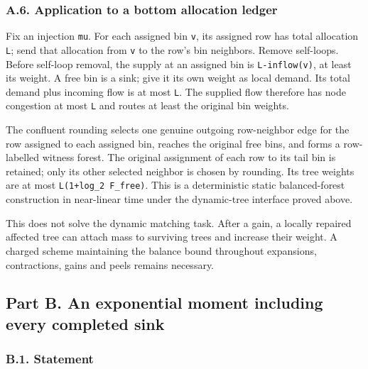\hypertarget{af-385fd70686-a.6.-application-to-a-bottom-allocation-ledger}{%
\subsubsection{A.6. Application to a bottom allocation ledger}\label{af-385fd70686-a.6.-application-to-a-bottom-allocation-ledger}}

Fix an injection \texttt{mu}. For each assigned bin \texttt{v}, its assigned row has total allocation \texttt{L}; send that allocation from \texttt{v} to the row's bin neighbors. Remove self-loops. Before self-loop removal, the supply at an assigned bin is \texttt{L-inflow(v)}, at least its weight. A free bin is a sink; give it its own weight as local demand. Its total demand plus incoming flow is at most \texttt{L}. The supplied flow therefore has node congestion at most \texttt{L} and routes at least the original bin weights.

The confluent rounding selects one genuine outgoing row-neighbor edge for the row assigned to each assigned bin, reaches the original free bins, and forms a row-labelled witness forest. The original assignment of each row to its tail bin is retained; only its other selected neighbor is chosen by rounding. Its tree weights are at most \texttt{L(1+log\_2\ \textbar{}F\_free\textbar{})}. This is a deterministic static balanced-forest construction in near-linear time under the dynamic-tree interface proved above.

This does not solve the dynamic matching task. After a gain, a locally repaired affected tree can attach mass to surviving trees and increase their weight. A charged scheme maintaining the balance bound throughout expansions, contractions, gains and peels remains necessary.

\hypertarget{af-385fd70686-part-b.-an-exponential-moment-including-every-completed-sink}{%
\subsection{Part B. An exponential moment including every completed sink}\label{af-385fd70686-part-b.-an-exponential-moment-including-every-completed-sink}}

\hypertarget{af-385fd70686-b.1.-statement}{%
\subsubsection{B.1. Statement}\label{af-385fd70686-b.1.-statement}}

